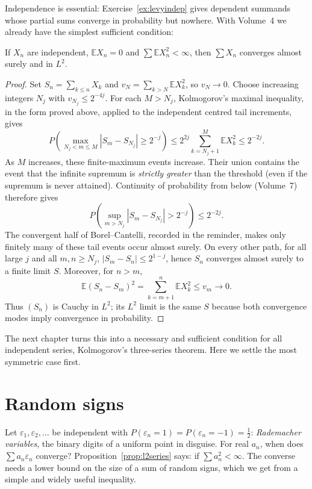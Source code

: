 Independence is essential: Exercise~\ref{ex:levyindep} gives dependent summands whose partial sums converge in probability but
nowhere. With Volume~4 we already have the simplest sufficient condition:

\begin{proposition}\label{prop:l2series}
If $X_n$ are independent, $\mathbb E X_n=0$ and $\sum\mathbb E X_n^2<\infty$, then $\sum X_n$ converges almost surely and in $L^2$.
\end{proposition}
\begin{proof}
Set $S_n=\sum_{k\le n}X_k$ and $v_N=\sum_{k>N}\mathbb E X_k^2$, so $v_N\to0$. Choose increasing integers $N_j$ with $v_{N_j}\le2^{-4j}$. For each $M>N_j$, Kolmogorov's maximal inequality, in the form proved above, applied to the independent centred tail increments, gives
\[
P\!\left(\max_{N_j<m\le M}|S_m-S_{N_j}|\ge2^{-j}\right)
\le 2^{2j}\sum_{k=N_j+1}^M\mathbb E X_k^2\le2^{-2j}.
\]
As $M$ increases, these finite-maximum events increase. Their union contains the event that the infinite supremum is \emph{strictly greater} than the threshold (even if the supremum is never attained). Continuity of probability from below (Volume~7) therefore gives
\[
P\!\left(\sup_{m>N_j}|S_m-S_{N_j}|>2^{-j}\right)\le2^{-2j}.
\]
The convergent half of Borel--Cantelli, recorded in the reminder, makes only finitely many of these tail events occur almost surely. On every other path, for all large $j$ and all $m,n\ge N_j$, $|S_m-S_n|\le2^{1-j}$, hence $S_n$ converges almost surely to a finite limit $S$. Moreover, for $n>m$,
\[
\mathbb E(S_n-S_m)^2=\sum_{k=m+1}^n\mathbb E X_k^2\le v_m\longrightarrow0.
\]
Thus $(S_n)$ is Cauchy in $L^2$; its $L^2$ limit is the same $S$ because both convergence modes imply convergence in probability.
\end{proof}

The next chapter turns this into a necessary and sufficient condition for all independent series, Kolmogorov's three-series
theorem. Here we settle the most symmetric case first.

\section{Random signs}

Let $\varepsilon_1,\varepsilon_2,\dots$ be independent with $P(\varepsilon_n=1)=P(\varepsilon_n=-1)=\frac12$: \emph{Rademacher
variables}, the binary digits of a uniform point in disguise. For real $a_n$, when does $\sum a_n\varepsilon_n$ converge?
Proposition~\ref{prop:l2series} says: if $\sum a_n^2<\infty$. The converse needs a lower bound on the size of a sum of random
signs, which we get from a simple and widely useful inequality.

